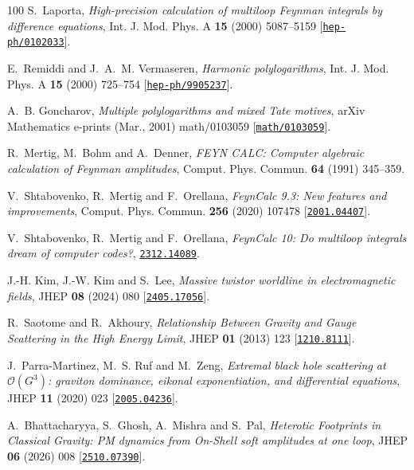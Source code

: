 \begin{thebibliography}{100}
S.~Laporta,  {\em {High-precision calculation of multiloop Feynman integrals by
  difference equations}}, Int. J. Mod. Phys. A {\bf 15} (2000) 5087--5159
  [\href{http://www.arXiv.org/abs/hep-ph/0102033}{{\tt hep-ph/0102033}}].

E.~Remiddi and J.~A.~M. Vermaseren,  {\em {Harmonic polylogarithms}}, Int. J.
  Mod. Phys. A {\bf 15} (2000) 725--754
  [\href{http://www.arXiv.org/abs/hep-ph/9905237}{{\tt hep-ph/9905237}}].

A.~B. {Goncharov},  {\em {Multiple polylogarithms and mixed Tate motives}},
  arXiv Mathematics e-prints (Mar., 2001) math/0103059
  [\href{http://www.arXiv.org/abs/math/0103059}{{\tt math/0103059}}].

R.~Mertig, M.~Bohm and A.~Denner,  {\em {FEYN CALC: Computer algebraic
  calculation of Feynman amplitudes}}, Comput. Phys. Commun. {\bf 64} (1991)
  345--359.

V.~Shtabovenko, R.~Mertig and F.~Orellana,  {\em {FeynCalc 9.3: New features
  and improvements}}, Comput. Phys. Commun. {\bf 256} (2020) 107478
  [\href{http://www.arXiv.org/abs/2001.04407}{{\tt 2001.04407}}].

V.~Shtabovenko, R.~Mertig and F.~Orellana,  {\em {FeynCalc 10: Do multiloop
  integrals dream of computer codes?}},
  \href{http://www.arXiv.org/abs/2312.14089}{{\tt 2312.14089}}.

J.-H. Kim, J.-W. Kim and S.~Lee,  {\em {Massive twistor worldline in
  electromagnetic fields}}, JHEP {\bf 08} (2024) 080
  [\href{http://www.arXiv.org/abs/2405.17056}{{\tt 2405.17056}}].

R.~Saotome and R.~Akhoury,  {\em {Relationship Between Gravity and Gauge
  Scattering in the High Energy Limit}}, JHEP {\bf 01} (2013) 123
  [\href{http://www.arXiv.org/abs/1210.8111}{{\tt 1210.8111}}].

J.~Parra-Martinez, M.~S. Ruf and M.~Zeng,  {\em {Extremal black hole scattering
  at $\mathcal{O}(G^3)$: graviton dominance, eikonal exponentiation, and
  differential equations}}, JHEP {\bf 11} (2020) 023
  [\href{http://www.arXiv.org/abs/2005.04236}{{\tt 2005.04236}}].

A.~Bhattacharyya, S.~Ghosh, A.~Mishra and S.~Pal,  {\em {Heterotic Footprints
  in Classical Gravity: PM dynamics from On-Shell soft amplitudes at one
  loop}}, JHEP {\bf 06} (2026) 008
  [\href{http://www.arXiv.org/abs/2510.07390}{{\tt 2510.07390}}].


\end{thebibliography}
